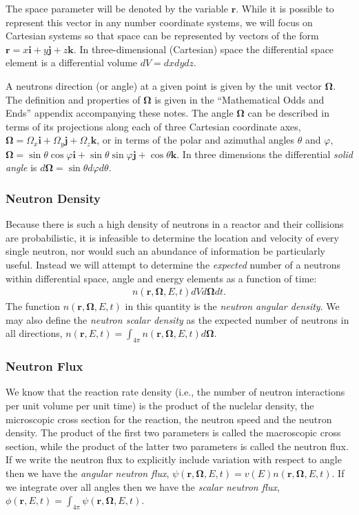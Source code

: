 \documentclass[11pt]{article}
\renewcommand\vec{\mathbf}
\begin{document}
The space parameter will be denoted by the variable \(\vec{r}\).  While it is possible to represent this vector in any number coordinate systems, we will focus on Cartesian systems so that space can be represented by vectors of the form \(\vec{r} = x\vec{i} + y\vec{j} + z \vec{k}\).  In three-dimensional (Cartesian) space the differential space element is a differential volume \(dV = dx dy dz\).

A neutrons direction (or angle) at a given point is given by the unit vector \(\vec{\Omega}\).  The definition and properties of \(\vec{\Omega}\) is given in the ``Mathematical Odds and Ends'' appendix accompanying these notes.  The angle \(\vec{\Omega}\) can be described in terms of its projections along each of three Cartesian coordinate axes, \(\vec{\Omega} = \Omega_x \vec{i} + \Omega_y \vec{j} + \Omega_z \vec{k}\), or in terms of the polar and azimuthal angles \(\theta\) and \(\varphi\), \(\vec{\Omega} = \sin\theta \cos\varphi \vec{i} + \sin\theta \sin\varphi \vec{j} + \cos\theta \vec{k}\).  In three dimensions the differential \emph{solid angle} is \(d\vec{\Omega} = \sin\theta d\varphi d\theta\).

\subsubsection{Neutron Density}
\label{sec:orgheadline44}
Because there is such a high density of neutrons in a reactor and their collisions are probabilistic, it is infeasible to determine the location and velocity of every single neutron, nor would such an abundance of information be particularly useful.  Instead we will attempt to determine the \emph{expected} number of a neutrons within differential space, angle and energy elements as a function of time:
\begin{align}
  n(\vec{r},\vec{\Omega},E,t) dV d\vec{\Omega} dt.
\end{align}
The function \(n(\vec{r},\vec{\Omega},E,t)\) in this quantity is the \emph{neutron angular density}.  We may also define the \emph{neutron scalar density} as the expected number of neutrons in all directions, \(n(\vec{r},E,t) = \int_{4\pi} n(\vec{r},\vec{\Omega},E,t) d\vec{\Omega}\).

\subsubsection{Neutron Flux}
\label{sec:orgheadline45}
We know that the reaction rate density (i.e., the number of neutron interactions per unit volume per unit time) is the product of the nuclelar density, the microscopic cross section for the reaction, the neutron speed and the neutron density.  The product of the first two parameters is called the macroscopic cross section, while the product of the latter two parameters is called the neutron flux.  If we write the neutron flux to explicitly include variation with respect to angle then we have the \emph{angular neutron flux}, \(\psi(\vec{r},\vec{\Omega},E,t) = v(E)n(\vec{r},\vec{\Omega},E,t)\).  If we integrate over all angles then we have the \emph{scalar neutron flux}, \(\phi(\vec{r},E,t) = \int_{4\pi} \psi(\vec{r},\vec{\Omega},E,t)\).
\end{document}
